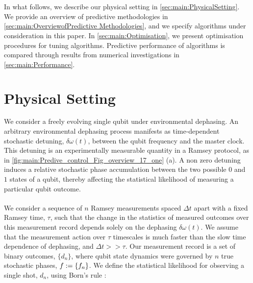 \\
\\
In what follows, we describe our physical setting in \cref{sec:main:PhysicalSetting}. We provide an overview of predictive methodologies in  \cref{sec:main:OverviewofPredictive Methodologies}, and we specify algorithms under consideration in this paper. In \cref{sec:main:Optimisation}, we present optimisation procedures for tuning algorithms. Predictive performance of algorithms is compared through results from numerical investigations in \cref{sec:main:Performance}. 

\section{Physical Setting \label{sec:main:PhysicalSetting}}  
\label{sec:main:1} 
We consider a freely evolving single qubit under environmental dephasing. An arbitrary environmental dephasing process manifests as time-dependent stochastic detuning, $\delta \omega (t)$, between the qubit frequency and the master clock. This detuning is an experimentally measurable quantity in a Ramsey protocol, as in \cref{fig:main:Predive_control_Fig_overview_17_one} (a). A non zero detuning induces a relative stochastic phase accumulation between the two possible $0$ and $1$ states of a qubit, thereby affecting the statistical likelihood of measuring a particular qubit outcome. 
\\
\\
We consider a sequence of $n$ Ramsey measurements spaced $\Delta t$ apart with a fixed Ramsey time, $\tau$, such that the change in the statistics of measured outcomes over this measurement record depends solely on the dephasing  $\delta \omega(t)$.   We assume that the measurement action over $\tau$ timescales is much faster than the slow time dependence of dephasing, and $\Delta t >> \tau$. Our measurement record is a set of binary outcomes,  $\{d_n\}$,  where qubit state dynamics were governed by $n$ true stochastic phases, $f := \{f_n\}$. We define the statistical likelihood for observing a single shot, $d_n$, using Born's rule \cite{ferrie2013}:


